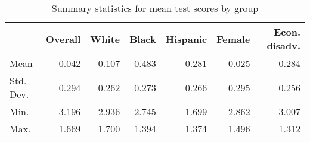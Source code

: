 \begin{table}

\caption{\label{tab:SumStats}Summary statistics for mean test scores by group}
\centering
\begin{tabular}[t]{lrrrrrr}
\toprule
  & Overall & White & Black & Hispanic & Female & Econ. disadv.\\
\midrule
Mean & -0.042 & 0.107 & -0.483 & -0.281 & 0.025 & -0.284\\
Std. Dev. & 0.294 & 0.262 & 0.273 & 0.266 & 0.295 & 0.256\\
Min. & -3.196 & -2.936 & -2.745 & -1.699 & -2.862 & -3.007\\
Max. & 1.669 & 1.700 & 1.394 & 1.374 & 1.496 & 1.312\\
\bottomrule
\end{tabular}
\end{table}
